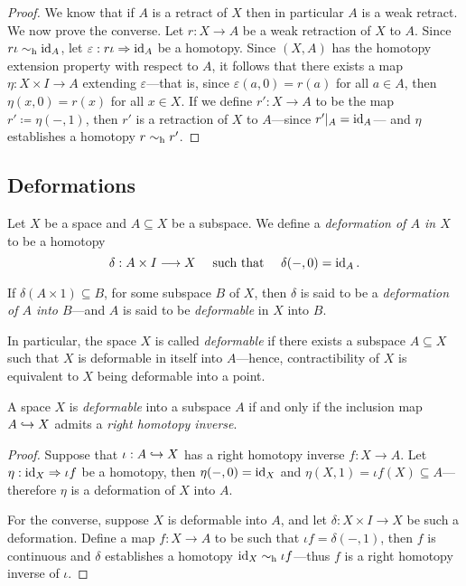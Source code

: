 \begin{proof}
We know that if \(A\) is a retract of \(X\) then in particular \(A\) is a weak
retract. We now prove the converse. Let \(r: X \to A\) be a weak retraction of
\(X\) to \(A\). Since \(r \iota \sim_{\text{h}} \operatorname{id}_A\), let
\(\varepsilon: r \iota \Rightarrow \operatorname{id}_A\) be a homotopy. Since \((X, A)\) has the
homotopy extension property with respect to \(A\), it follows that there exists
a map \(\eta: X \times I \to A\) extending \(\varepsilon\)---that is, since
\(\varepsilon(a, 0) = r(a)\) for all \(a \in A\), then \(\eta(x, 0) = r(x)\) for
all \(x \in X\). If we define \(r': X \to A\) to be the map
\(r' \coloneq \eta(-, 1)\), then \(r'\) is a retraction of \(X\) to
\(A\)---since \(r'|_A = \operatorname{id}_A\)--- and \(\eta\) establishes a homotopy
\(r \sim_{\text{h}} r'\).
\end{proof}

\subsection{Deformations}

\begin{definition}[Deformation]
\label{def:deformation}
Let \(X\) be a space and \(A \subseteq X\) be a subspace. We define a
\emph{deformation of \(A\) in \(X\)} to be a homotopy
\[
\delta: A \times I \longrightarrow X
\quad\text{ such that }\quad
\delta(-, 0) = \operatorname{id}_A.
\]

If \(\delta(A \times 1) \subseteq B\), for some subspace \(B\) of \(X\), then
\(\delta\) is said to be a \emph{deformation of \(A\) into \(B\)}---and \(A\) is
said to be \emph{deformable} in \(X\) into \(B\).

In particular, the space \(X\) is called \emph{deformable} if there exists a
subspace \(A \subseteq X\) such that \(X\) is deformable in itself into
\(A\)---hence, contractibility of \(X\) is equivalent to \(X\) being deformable
into a point.
\end{definition}

\begin{lemma}
\label{lem:deformable-iff-right-inverse}
A space \(X\) is \emph{deformable} into a subspace \(A\) if and only if the
inclusion map \(A \hookrightarrow X\) admits a \emph{right homotopy inverse}.
\end{lemma}

\begin{proof}
Suppose that \(\iota: A \hookrightarrow X\) has a right homotopy inverse \(f: X \to
A\). Let \(\eta: \operatorname{id}_X \Rightarrow \iota f\) be a homotopy, then \(\eta(-, 0) =
\operatorname{id}_X\) and \(\eta(X, 1) = \iota f(X) \subseteq A\)---therefore \(\eta\) is a
deformation of \(X\) into \(A\).

For the converse, suppose \(X\) is deformable into \(A\), and let \(\delta: X
\times I \to X\) be such a deformation. Define a map \(f: X \to A\) to be such
that \(\iota f = \delta(-, 1)\), then \(f\) is continuous and \(\delta\)
establishes a homotopy \(\operatorname{id}_X \sim_{\text{h}} \iota f\)---thus \(f\) is a right homotopy
inverse of \(\iota\).
\end{proof}

